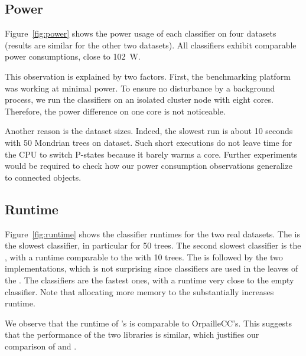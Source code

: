 \subsection{Power}
\label{sec:result-power}
Figure~\ref{fig:power} shows the power usage of each classifier on four
datasets (results are similar for the other two datasets). All classifiers exhibit comparable power consumptions, close to
102~W. 

This observation is explained by two factors. First, the benchmarking
platform was  working at minimal power. To ensure no disturbance by a
background process, we run the classifiers on an isolated cluster node with
eight cores. Therefore, the power difference on one core is not noticeable.

Another reason is the dataset sizes. Indeed, the slowest run is about
10 seconds with 50 Mondrian trees on \recofitdataset dataset. Such short
executions do not leave time for the CPU to switch P-states because it
barely warms a core. Further experiments would be required to check how 
our power consumption observations generalize to 
connected objects. 

\subsection{Runtime}

Figure~\ref{fig:runtime} shows the classifier runtimes for the two real
datasets. The \mondrianforest is the slowest classifier, in particular for 50
trees. The second slowest classifier is the \hoeffdingtree, with a runtime
comparable to the \mondrianforest with 10 trees. The \hoeffdingtree is followed
by the two \naivebayes implementations, which is not surprising since
\naivebayes classifiers are used in the leaves of the \hoeffdingtree. The \mcnn
classifiers are the fastest ones, with a runtime very close to the empty
classifier. Note that allocating more memory to the \mondrianforest
substantially increases runtime.

We observe that the runtime of \streamdmcpp's \naivebayes is comparable to
OrpailleCC's. This suggests that the performance of the two libraries is
similar, which justifies our comparison of \hoeffdingtree and \mondrianforest.


